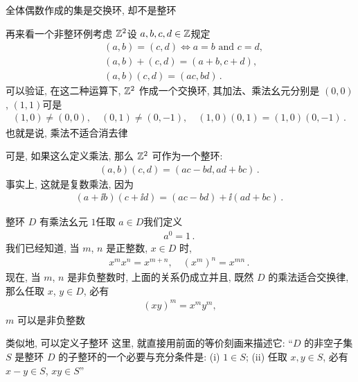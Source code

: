 \begin{example}
    全体偶数作成的集是交换环, 却不是整环\period
\end{example}

\begin{example}
    再来看一个非整环例\period 考虑 $\mathbb{Z}^2$\period 设 $a,b,c,d \in \mathbb{Z}$\period 规定
    \begin{align*}
         & (a,b) = (c,d) \iff a = b \text{ and } c = d, \\
         & (a,b) + (c,d) = (a+b,c+d),                   \\
         & (a,b)(c,d) = (ac,bd)\period
    \end{align*}
    可以验证, 在这二种运算下, $\mathbb{Z}^2$ 作成一个交换环, 其加法、乘法幺元分别是 $(0,0)$, $(1,1)$\period 可是
    \begin{align*}
        (1,0) \neq (0,0), \quad (0,1) \neq (0,-1), \quad (1,0)(0,1) = (1,0)(0,-1) \period
    \end{align*}
    也就是说, 乘法不适合消去律\period
\end{example}

\begin{remark}
    可是, 如果这么定义乘法, 那么 $\mathbb{Z}^2$ 可作为一个整环:
    \begin{align*}
        (a,b)(c,d) = (ac-bd,ad+bc)\period
    \end{align*}
    事实上, 这就是复数乘法, 因为
    \begin{align*}
        (a+ \ii b)(c+ \ii d) = (ac-bd) + \ii (ad+bc) \period
    \end{align*}
\end{remark}

\begin{remark}
    整环 $D$ 有乘法幺元 $1$\period 任取 $a \in D$\period 我们定义
    \begin{align*}
        a^0 = 1 \period
    \end{align*}
    我们已经知道, 当 $m$, $n$ 是正整数, $x \in D$ 时,
    \begin{align*}
        x^m x^n = x^{m+n}, \quad (x^m)^n = x^{mn} \period
    \end{align*}
    现在, 当 $m$, $n$ 是非负整数时, 上面的关系仍成立\period 并且, 既然 $D$ 的乘法适合交换律, 那么任取 $x$, $y \in D$, 必有
    \begin{align*}
        (xy)^m = x^m y^m,
    \end{align*}
    $m$ 可以是非负整数\period
\end{remark}

\begin{remark}
    类似地, 可以定义子整环 \period 这里, 就直接用前面的等价刻画来描述它: ``$D$ 的非空子集 $S$ 是整环 $D$ 的子整环的一个必要与充分条件是: (i) $1 \in S$; (ii) 任取 $x,y \in S$, 必有 $x-y \in S$, $xy \in S$\period ''
\end{remark}

